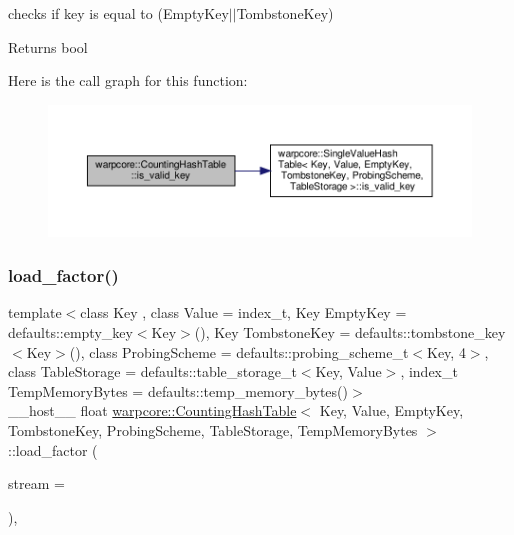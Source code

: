 checks if {\ttfamily key} is equal to {\ttfamily }(Empty\+Key$\vert$$\vert$\+Tombstone\+Key) 

\begin{DoxyReturn}{Returns}
{\ttfamily bool} 
\end{DoxyReturn}
Here is the call graph for this function\+:
\nopagebreak
\begin{figure}[H]
\begin{center}
\leavevmode
\includegraphics[width=350pt]{classwarpcore_1_1CountingHashTable_ab186fb0eadd3f5d1cd5bc290489ab0df_cgraph}
\end{center}
\end{figure}
\mbox{\label{classwarpcore_1_1CountingHashTable_aab45751b9ecffd2a8cd2b822cab26467}} 
\subsubsection{\texorpdfstring{load\+\_\+factor()}{load\_factor()}}
{\footnotesize\ttfamily template$<$class Key , class Value  = index\+\_\+t, Key Empty\+Key = defaults\+::empty\+\_\+key$<$\+Key$>$(), Key Tombstone\+Key = defaults\+::tombstone\+\_\+key$<$\+Key$>$(), class Probing\+Scheme  = defaults\+::probing\+\_\+scheme\+\_\+t$<$\+Key, 4$>$, class Table\+Storage  = defaults\+::table\+\_\+storage\+\_\+t$<$\+Key, Value$>$, index\+\_\+t Temp\+Memory\+Bytes = defaults\+::temp\+\_\+memory\+\_\+bytes()$>$ \\
\+\_\+\+\_\+host\+\_\+\+\_\+ float \hyperlink{classwarpcore_1_1CountingHashTable}{warpcore\+::\+Counting\+Hash\+Table}$<$ Key, Value, Empty\+Key, Tombstone\+Key, Probing\+Scheme, Table\+Storage, Temp\+Memory\+Bytes $>$\+::load\+\_\+factor (\begin{DoxyParamCaption}\item[{cuda\+Stream\+\_\+t}]{stream = {} }\end{DoxyParamCaption})\hspace{0.3cm}{\ttfamily [inline]}, {\ttfamily [noexcept]}}



